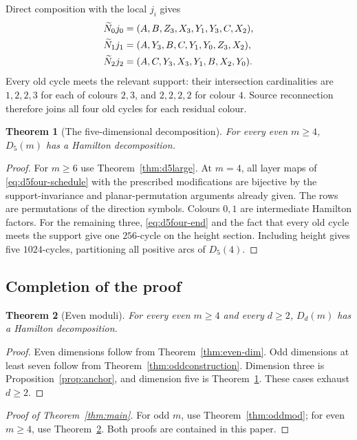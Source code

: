 \documentclass[11pt,reqno]{amsart}
\numberwithin{equation}{section}
\newtheorem{theorem}{Theorem}[section]
\theoremstyle{definition}
\theoremstyle{remark}
\begin{document}
Direct composition with the local $j_i$ gives
\begin{align}
 \widetilde N_0j_0&=(A,B,Z_3,X_3,Y_1,Y_3,C,X_2),\notag\\
 \widetilde N_1j_1&=(A,Y_3,B,C,Y_1,Y_0,Z_3,X_2),\label{eq:d5four-end}\\
 \widetilde N_2j_2&=(A,C,Y_3,X_3,Y_1,B,X_2,Y_0).\notag
\end{align}
Every old cycle meets the relevant support: their intersection cardinalities
are $1,2,2,3$ for each of colours $2,3$, and $2,2,2,2$ for colour $4$.
Source reconnection therefore joins all four old cycles for each residual colour.

\begin{theorem}[The five-dimensional decomposition]\label{thm:d5}
For every even $m\ge4$, $D_5(m)$ has a Hamilton decomposition.
\end{theorem}
\begin{proof}
For $m\ge6$ use Theorem~\ref{thm:d5large}. At $m=4$, all layer maps of
\eqref{eq:d5four-schedule} with the prescribed modifications are bijective by the
support-invariance and planar-permutation arguments already given. The rows are
permutations of the direction symbols. Colours $0,1$ are intermediate Hamilton factors. For the remaining three,
\eqref{eq:d5four-end} and the fact that every old cycle meets the support
give one $256$-cycle
on the height section. Including height gives five $1024$-cycles, partitioning
all positive arcs of $D_5(4)$.
\end{proof}

\subsection{Completion of the proof}
\begin{theorem}[Even moduli]\label{thm:even}
For every even $m\ge4$ and every $d\ge2$, $D_d(m)$ has a Hamilton decomposition.
\end{theorem}
\begin{proof}
Even dimensions follow from Theorem~\ref{thm:even-dim}. Odd dimensions at
least seven follow from Theorem~\ref{thm:oddconstruction}. Dimension three
is Proposition~\ref{prop:anchor}, and dimension five is Theorem~\ref{thm:d5}.
These cases exhaust $d\ge2$.
\end{proof}

\begin{proof}[Proof of Theorem~\ref{thm:main}]
For odd $m$, use Theorem~\ref{thm:oddmod}; for even $m\ge4$, use
Theorem~\ref{thm:even}. Both proofs are contained in this paper.
\end{proof}
\end{document}
